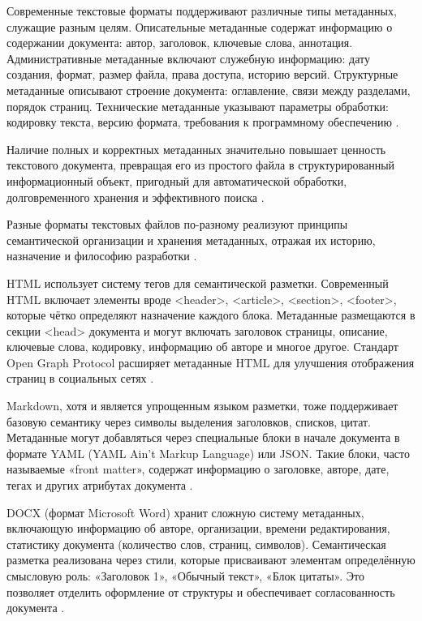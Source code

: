 \documentclass{SibFU-docs}
\begin{document}
Современные текстовые форматы поддерживают различные типы метаданных, служащие разным целям. Описательные метаданные содержат информацию о содержании документа: автор, заголовок, ключевые слова, аннотация. Административные метаданные включают служебную информацию: дату создания, формат, размер файла, права доступа, историю версий. Структурные метаданные описывают строение документа: оглавление, связи между разделами, порядок страниц. Технические метаданные указывают параметры обработки: кодировку текста, версию формата, требования к программному обеспечению \cite{dublincore, gilliland2016metadata}.

Наличие полных и корректных метаданных значительно повышает ценность текстового документа, превращая его из простого файла в структурированный информационный объект, пригодный для автоматической обработки, долговременного хранения и эффективного поиска \cite{bernerslee2001semanticweb}.


Разные форматы текстовых файлов по-разному реализуют принципы семантической организации и хранения метаданных, отражая их историю, назначение и философию разработки \cite{w3c_html, pdf_xmp}.

HTML использует систему тегов для семантической разметки. Современный HTML включает элементы вроде <header>, <article>, <section>, <footer>, которые чётко определяют назначение каждого блока. Метаданные размещаются в секции <head> документа и могут включать заголовок страницы, описание, ключевые слова, кодировку, информацию об авторе и многое другое. Стандарт Open Graph Protocol расширяет метаданные HTML для улучшения отображения страниц в социальных сетях \cite{w3c_html}.

Markdown, хотя и является упрощенным языком разметки, тоже поддерживает базовую семантику через символы выделения заголовков, списков, цитат. Метаданные могут добавляться через специальные блоки в начале документа в формате YAML (YAML Ain't Markup Language) или JSON. Такие блоки, часто называемые «front matter», содержат информацию о заголовке, авторе, дате, тегах и других атрибутах документа \cite{markdown_yaml}.

DOCX (формат Microsoft Word) хранит сложную систему метаданных, включающую информацию об авторе, организации, времени редактирования, статистику документа (количество слов, страниц, символов). Семантическая разметка реализована через стили, которые присваивают элементам определённую смысловую роль: «Заголовок 1», «Обычный текст», «Блок цитаты». Это позволяет отделить оформление от структуры и обеспечивает согласованность документа \cite{ecma376}.
\end{document}
